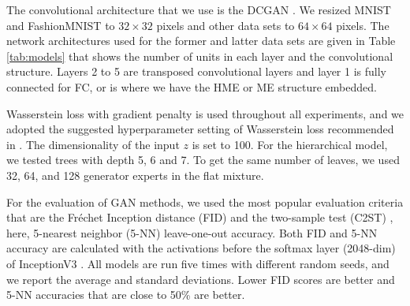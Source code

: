 \documentclass[a4paper,onesided,12pt]{report}
\begin{document}
The convolutional architecture that we use is the DCGAN \cite{dcgan}. We resized MNIST and FashionMNIST to $32\times 32$ pixels and other data sets to $64\times 64$ pixels. The network architectures used for the former and latter data sets are given in Table \ref{tab:models} that shows the number of units in each layer and the convolutional structure. Layers 2 to 5 are transposed convolutional layers and layer 1 is fully connected for FC, or is where we have the HME or ME structure embedded. 

Wasserstein loss \cite{wgan} with gradient penalty \cite{improved_wgan} is used throughout all experiments, and we adopted the suggested hyperparameter setting of Wasserstein loss recommended in \cite{improved_wgan}. The dimensionality of the input $z$ is set to 100. For the hierarchical model, we tested trees with depth 5, 6 and 7. To get the same number of leaves, we used 32, 64, and 128 generator experts in the flat mixture. 

For the evaluation of GAN methods, we used the most popular evaluation criteria that are the Fr\'echet Inception distance (FID) \cite{twotimes} and the two-sample test (C2ST) \cite{twosample}, here, 5-nearest neighbor (5-NN) leave-one-out accuracy. Both FID and 5-NN accuracy are calculated with the activations before the softmax layer (2048-dim) of InceptionV3 \cite{inceptionv3}. All models are run five times with different random seeds, and we report the average and standard deviations. Lower FID scores are better and 5-NN accuracies that are close to 50\% are better. 
\end{document}
